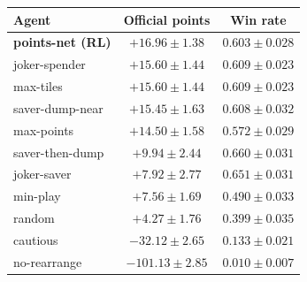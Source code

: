 \begin{tabular}{lcc}\toprule
Agent & Official points & Win rate\\\midrule
\textbf{points-net (RL)} & $+16.96\pm1.38$ & $0.603\pm0.028$\\
joker-spender & $+15.60\pm1.44$ & $0.609\pm0.023$\\
max-tiles & $+15.60\pm1.44$ & $0.609\pm0.023$\\
saver-dump-near & $+15.45\pm1.63$ & $0.608\pm0.032$\\
max-points & $+14.50\pm1.58$ & $0.572\pm0.029$\\
saver-then-dump & $+9.94\pm2.44$ & $0.660\pm0.031$\\
joker-saver & $+7.92\pm2.77$ & $0.651\pm0.031$\\
min-play & $+7.56\pm1.69$ & $0.490\pm0.033$\\
random & $+4.27\pm1.76$ & $0.399\pm0.035$\\
cautious & $-32.12\pm2.65$ & $0.133\pm0.021$\\
no-rearrange & $-101.13\pm2.85$ & $0.010\pm0.007$\\
\bottomrule\end{tabular}
